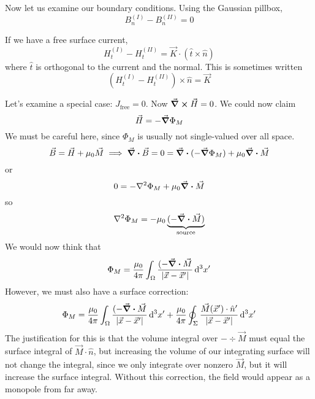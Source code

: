 \documentclass[a4paper,twoside,master.tex]{subfiles}
\begin{document}
Now let us examine our boundary conditions. Using the Gaussian pillbox,
\begin{equation}
    B_n^{(I)} - B_n^{(II)} = 0
\end{equation}

If we have a free surface current,
\begin{equation}
    H_t^{(I)} - H_t^{(II)} = \vec{K} \cdot ( \hat{t} \times \hat{n} )
\end{equation}
where $ \hat{t} $ is orthogonal to the current and the normal. This is sometimes written
\begin{equation}
    (H_t^{(I)} - H_t^{(II)} ) \times \hat{n} = \vec{K}
\end{equation}

Let's examine a special case: $ J_{\text{free}} = 0  $. Now $ \curl{ \vec{H}} = 0 $. We could now claim
\begin{equation}
    \vec{H} = - \grad{\Phi_{M}}
\end{equation}
We must be careful here, since $ \Phi_{M} $ is usually not single-valued over all space.
\begin{equation}
    \vec{B} = \vec{H} + \mu_0 \vec{M} \implies \div{ \vec{B}} = 0 = \div{(- \grad{\Phi_M})} + \mu_0 \div{ \vec{M}}
\end{equation}
or
\begin{equation}
    0 = - \laplacian{\Phi_M} + \mu_0 \div{ \vec{M}}
\end{equation}
so
\begin{equation}
    \laplacian{\Phi_M} = - \mu_0 \underbrace{(- \div{ \vec{M}})}_{\text{source}}
\end{equation}
We would now think that
\begin{equation}
    \Phi_M = \frac{\mu_0}{4 \pi} \int_\Omega \frac{(- \div{ \vec{M}}}{\abs{ \vec{x} - \vec{x}'}} \dd[3]{x'}
\end{equation}
However, we must also have a surface correction:
\begin{equation}
    \Phi_M = \frac{\mu_0}{4 \pi} \int_\Omega \frac{(- \div{ \vec{M}}}{\abs{ \vec{x} - \vec{x}'}} \dd[3]{x'} + \frac{\mu_0}{4 \pi} \oint_\Sigma \frac{ \vec{M}( \vec{x}') \cdot \hat{n}'}{\abs{ \vec{x} - \vec{x}'}} \dd[3]{x'} 
\end{equation}
The justification for this is that the volume integral over $ - \div{ \vec{M}} $ must equal the surface integral of $ \vec{M} \cdot \hat{n} $, but increasing the volume of our integrating surface will not change the integral, since we only integrate over nonzero $ \vec{M} $, but it will increase the surface integral. Without this correction, the field would appear as a monopole from far away.
\end{document}
